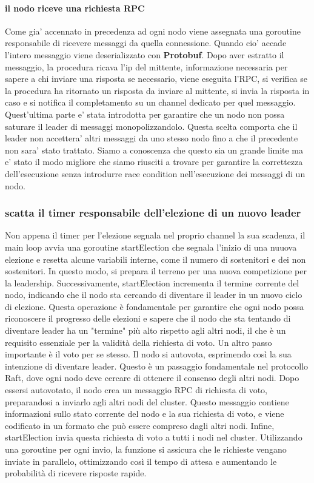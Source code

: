 \paragraph{il nodo riceve una richiesta RPC}
Come gia' accennato in precedenza ad ogni nodo viene assegnata una goroutine responsabile di
ricevere messaggi da quella connessione. Quando cio' accade l'intero messaggio viene deserializzato
con \textbf{Protobuf}.
Dopo aver estratto il messaggio, la procedura ricava l'ip del mittente, informazione necessaria per 
sapere a chi inviare una risposta se necessario,
viene eseguita l'RPC, si verifica se la procedura ha ritornato un risposta da inviare al mittente,
si invia la risposta in caso e si notifica il completamento su un channel dedicato 
per quel messaggio. Quest'ultima parte e' stata introdotta per garantire che un nodo non possa 
saturare il leader di messaggi monopolizzandolo. Questa scelta comporta che il leader non accettera' 
altri messaggi da uno stesso nodo fino a che il precedente non sara' stato trattato. Siamo a 
conoscenza che questo sia un grande limite ma e' stato il modo migliore che siamo riusciti 
a trovare per garantire la correttezza dell'esecuzione senza introdurre race condition nell'esecuzione
dei messaggi di un nodo.

\subsubsection{scatta il timer responsabile dell'elezione di un nuovo leader}
Non appena il timer per l'elezione segnala nel proprio channel la sua scadenza, il main loop avvia 
una goroutine startElection che segnala l'inizio di una nuuova elezione e resetta alcune variabili 
interne, come il numero di sostenitori e dei non sostenitori. In questo modo, si prepara il terreno 
per una nuova competizione per la leadership.
Successivamente, startElection incrementa il termine corrente del nodo, indicando che il nodo sta 
cercando di diventare il leader in un nuovo ciclo di elezione. Questa operazione è fondamentale per 
garantire che ogni nodo possa riconoscere il progresso delle elezioni e sapere che il nodo che sta 
tentando di diventare leader ha un "termine" più alto rispetto agli altri nodi, il che è un 
requisito essenziale per la validità della richiesta di voto.
Un altro passo importante è il voto per se stesso. Il nodo si autovota, esprimendo così la sua 
intenzione di diventare leader. Questo è un passaggio fondamentale nel protocollo Raft, dove ogni 
nodo deve cercare di ottenere il consenso degli altri nodi.
Dopo essersi autovotato, il nodo crea un messaggio RPC di richiesta di voto, preparandosi a 
inviarlo agli altri nodi del cluster. Questo messaggio contiene informazioni sullo stato corrente 
del nodo e la sua richiesta di voto, e viene codificato in un formato che può essere compreso 
dagli altri nodi.
Infine, startElection invia questa richiesta di voto a tutti i nodi nel cluster. Utilizzando una 
goroutine per ogni invio, la funzione si assicura che le richieste vengano inviate in parallelo, 
ottimizzando così il tempo di attesa e aumentando le probabilità di ricevere risposte rapide.

